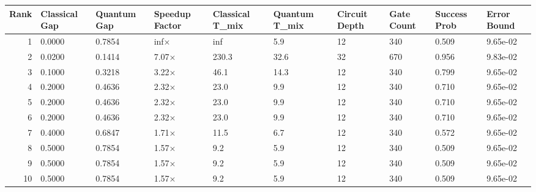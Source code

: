 \begin{tabular}{rlllllllll}
\toprule
Rank & Classical Gap & Quantum Gap & Speedup Factor & Classical T_mix & Quantum T_mix & Circuit Depth & Gate Count & Success Prob & Error Bound \\
\midrule
1 & 0.0000 & 0.7854 & inf× & inf & 5.9 & 12 & 340 & 0.509 & 9.65e-02 \\
2 & 0.0200 & 0.1414 & 7.07× & 230.3 & 32.6 & 32 & 670 & 0.956 & 9.83e-02 \\
3 & 0.1000 & 0.3218 & 3.22× & 46.1 & 14.3 & 12 & 340 & 0.799 & 9.65e-02 \\
4 & 0.2000 & 0.4636 & 2.32× & 23.0 & 9.9 & 12 & 340 & 0.710 & 9.65e-02 \\
5 & 0.2000 & 0.4636 & 2.32× & 23.0 & 9.9 & 12 & 340 & 0.710 & 9.65e-02 \\
6 & 0.2000 & 0.4636 & 2.32× & 23.0 & 9.9 & 12 & 340 & 0.710 & 9.65e-02 \\
7 & 0.4000 & 0.6847 & 1.71× & 11.5 & 6.7 & 12 & 340 & 0.572 & 9.65e-02 \\
8 & 0.5000 & 0.7854 & 1.57× & 9.2 & 5.9 & 12 & 340 & 0.509 & 9.65e-02 \\
9 & 0.5000 & 0.7854 & 1.57× & 9.2 & 5.9 & 12 & 340 & 0.509 & 9.65e-02 \\
10 & 0.5000 & 0.7854 & 1.57× & 9.2 & 5.9 & 12 & 340 & 0.509 & 9.65e-02 \\
\bottomrule
\end{tabular}
